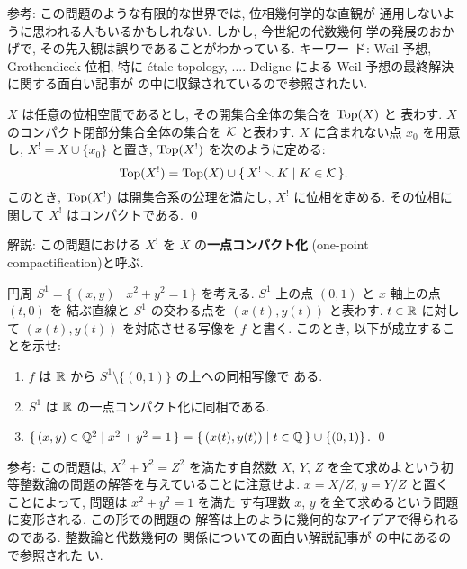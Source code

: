 \documentclass[12pt,twoside]{jarticle}
\def\Top{\mathop{\text{\rm Top}}\nolimits}
\def\Q{{\Bbb Q}} %
\def\R{{\Bbb R}} %
\begin{document}
\noindent 参考: この問題のような有限的な世界では, 位相幾何学的な直観が
通用しないように思われる人もいるかもしれない. しかし, 今世紀の代数幾何
学の発展のおかげで, その先入観は誤りであることがわかっている. キーワー
ド: Weil 予想, Grothendieck 位相, 特に \'etale topology, $\ldots$. %
Deligne による Weil 予想の最終解決に関する面白い記事が \cite{Kuga}{} 
の中に収録されているので参照されたい.

\begin{question}[一点コンパクト化]
  $X$ は任意の位相空間であるとし, その開集合全体の集合を $\Top(X)$ と
  表わす. $X$ のコンパクト閉部分集合全体の集合を ${\cal K}$ と表わす. 
  $X$ に含まれない点 $x_0$ を用意し, $X^! = X \cup \{x_0\}$ と置き, 
  $\Top(X^!)$ を次のように定める:
  \[
    \Top(X^!)
    =
    \Top(X)
    \cup
    \{\, X^! \setminus K \mid K \in {\cal K} \,\}.
  \] %
  このとき, $\Top(X^!)$ は開集合系の公理を満たし, $X^!$ に位相を定める. 
  その位相に関して $X^!$ はコンパクトである. \qed
\end{question}

\noindent 解説: この問題における $X^!$ を $X$ の{\bf 一点コンパクト化}
(one-point compactification)と呼ぶ.  

\begin{question}
  円周 $S^1 = \{\, (x,y) \mid x^2 + y^2 = 1 \,\}$ を考える. %
  $S^1$ 上の点 $(0,1)$ と $x$ 軸上の点 $(t,0)$ を
  結ぶ直線と $S^1$ の交わる点を $(x(t), y(t))$ と表わす. %
  $t\in\R$ に対して $(x(t), y(t))$ を対応させる写像を $f$ と書く. 
  このとき, 以下が成立することを示せ:
  \begin{enumerate}
  \item $f$ は $\R$ から $S^1 \setminus \{(0,1)\}$ の上への同相写像で
    ある.
  \item $S^1$ は $\R$ の一点コンパクト化に同相である.
  \item 
    \(
      \{\,(x,y)\in\Q^2 \mid x^2 + y^2 = 1\,\}
      =
      \{\,(x(t),y(t)) \mid t \in \Q\,\} \cup \{(0,1)\}
    \).
  \qed
  \end{enumerate}
\end{question}

\noindent 参考: この問題は, $X^2 + Y^2 = Z^2$ を満たす自然数 $X$, $Y$,
$Z$ を全て求めよという初等整数論の問題の解答を与えていることに注意せよ.
$x = X/Z$, $y = Y/Z$ と置くことによって, 問題は $x^2 + y^2 = 1$ を満た
す有理数 $x$, $y$ を全て求めるという問題に変形される. この形での問題の
解答は上のように幾何的なアイデアで得られるのである. 整数論と代数幾何の
関係についての面白い解説記事が \cite{Kuga}{} の中にあるので参照された
い.
\end{document}

